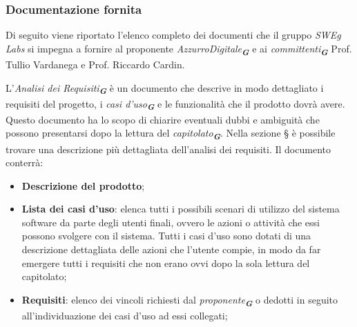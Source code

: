 \begin{enumerate}
\subsubsection{Documentazione fornita}
\label{sec:documentazione_fornita}
Di seguito viene riportato l'elenco completo dei documenti che il gruppo \emph{SWEg Labs} si impegna a fornire al proponente \emph{AzzurroDigitale}\textsubscript{\textit{\textbf{G}}}
e ai \emph{committenti}\textsubscript{\textit{\textbf{G}}} Prof. Tullio Vardanega e Prof. Riccardo Cardin.

L'\emph{Analisi dei Requisiti}\textsubscript{\textit{\textbf{G}}} è un documento che descrive in modo dettagliato i requisiti del progetto, i \emph{casi d'uso}\textsubscript{\textit{\textbf{G}}} e le funzionalità che il prodotto dovrà avere. 
Questo documento ha lo scopo di chiarire eventuali dubbi e ambiguità che possono presentarsi dopo la lettura del \emph{capitolato}\textsubscript{\textit{\textbf{G}}}.
Nella sezione \S{} è possibile trovare una descrizione più dettagliata dell'analisi dei requisiti.
Il documento conterrà:
\begin{itemize}
    \item \textbf{Descrizione del prodotto};
    \item \textbf{Lista dei casi d'uso}: elenca tutti i possibili scenari di utilizzo del sistema software
    da parte degli utenti finali, ovvero le azioni o attività che essi possono svolgere con il
    sistema. Tutti i casi d’uso sono dotati di una descrizione dettagliata delle azioni che
    l’utente compie, in modo da far emergere tutti i requisiti che non erano ovvi dopo la
    sola lettura del capitolato;
    \item \textbf{Requisiti}: elenco dei vincoli richiesti dal \emph{proponente}\textsubscript{\textit{\textbf{G}}} o dedotti in seguito all'individuazione dei casi d'uso ad essi collegati;
\end{itemize}


\end{enumerate}
